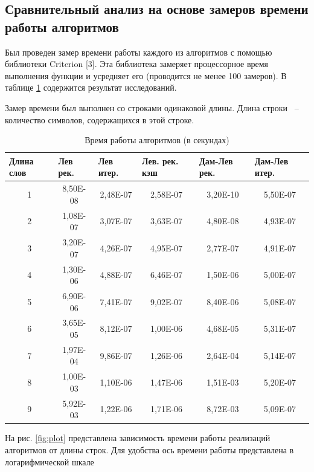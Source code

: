 \documentclass[14pt,russian]{scrartcl}
\begin{document}
	\subsection{Сравнительный анализ на основе замеров времени работы алгоритмов}
	
	Был проведен замер времени работы каждого из алгоритмов с помощью библиотеки Criterion [3]. Эта библиотека замеряет процессорное время выполнения функции и усредняет его (проводится не менее 100 замеров). В таблице \ref{tab:bench} содержится результат исследований.

	Замер времени был выполнен со строками одинаковой длины. Длина строки ~--~ количество символов, содержащихся в этой строке.\

	\begin{table}[htb]
		\caption{\centering Время работы алгоритмов (в секундах)}
		\centering
		\begin{tabular}{|c|c|c|c|c|c|}
		\hline
		\multicolumn{1}{|l|}{Длина слов} &
		  \multicolumn{1}{l|}{Лев рек.} &
		  \multicolumn{1}{l|}{Лев итер.} &
		  \multicolumn{1}{l|}{Лев. рек. кэш} &
		  \multicolumn{1}{l|}{Дам-Лев рек.} &
		  \multicolumn{1}{l|}{Дам-Лев итер.} \\ \hline
		1 & 8,50E-08 & 2,48E-07 & 2,58E-07 & 3,20E-10 & 5,50E-07 \\ \hline
		2 & 1,08E-07 & 3,07E-07 & 3,63E-07 & 4,80E-08 & 4,93E-07 \\ \hline
		3 & 3,20E-07 & 4,26E-07 & 4,95E-07 & 2,77E-07 & 4,91E-07 \\ \hline
		4 & 1,30E-06 & 4,88E-07 & 6,46E-07 & 1,50E-06 & 5,00E-07 \\ \hline
		5 & 6,90E-06 & 7,41E-07 & 9,02E-07 & 8,40E-06 & 5,08E-07 \\ \hline
		6 & 3,65E-05 & 8,12E-07 & 1,00E-06 & 4,68E-05 & 5,31E-07 \\ \hline
		7 & 1,97E-04 & 9,86E-07 & 1,26E-06 & 2,64E-04 & 5,14E-07 \\ \hline
		8 & 1,00E-03 & 1,10E-06 & 1,47E-06 & 1,51E-03 & 5,20E-07 \\ \hline
		9 & 5,92E-03 & 1,22E-06 & 1,71E-06 & 8,72E-03 & 5,09E-07 \\ \hline
		\end{tabular}
		\label{tab:bench}
		\end{table}

	\pagebreak

	На рис. \ref{fig:plot} представлена зависимость времени работы реализаций алгоритмов от длины строк. Для удобства ось времени работы представлена в логарифмической шкале
	
\end{document}
